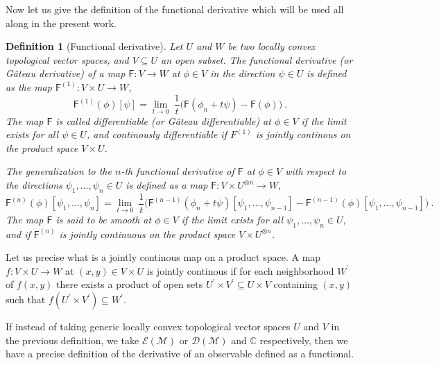 \documentclass[10pt]{book}
\newcommand{\Dcal}{\mathcal{D}}
\newcommand{\Ecal}{\mathcal{E}}
\newcommand{\Mcal}{\mathcal{M}}
\newcommand{\Cbb}{\mathbb{C}}
\newcommand{\Fsf}{\mathsf{F}}
\theoremstyle{break}
\newtheorem{definition}{Definition}
\begin{document}
\bigskip


Now let us give the definition of the functional derivative which will be used all along in the present work.


\begin{definition}[Functional derivative]\label{def:functional_derivative}
Let $U$ and $W$ be two locally convex topological vector spaces, and $V \subseteq U$ an open subset. The functional derivative (or Gâteau derivative) of a map $\Fsf:  V \to W$ at $\phi \in V$ in the direction $\psi \in U$ is defined as the map $\Fsf^{(1)} : V \times U \to W$,
%
\begin{equation*}
\Fsf^{(1)}(\phi)[\psi] = \lim_{t \to 0} \ \frac{1}{t} \bigg( \Fsf(\phi_n + t \psi) - \Fsf(\phi) \bigg) \ .
\end{equation*}
% 
The map $\Fsf$ is called differentiable (or Gâteau differentiable) at $\phi \in V$ if the limit exists for all $\psi \in U$, and continously differentiable if $F^{(1)}$ is jointly continous on the product space $V \times U$.\par%
%
%
The generalization to the $n$-th functional derivative of $\Fsf$ at $\phi \in V$ with respect to the directions $\psi_1, \dots, \psi_n \in U$ is defined as a map $\Fsf : V \times U^{\otimes n} \to W$,
%
\begin{equation*}%
\Fsf^{(n)}(\phi)[\psi_1,\dots ,\psi_n] = \lim_{t \to 0} \ \frac{1}{t} \bigg( \Fsf^{(n-1)}(\phi_n + t \psi)[\psi_1,\dots ,\psi_{n-1}] - \Fsf^{(n-1)}(\phi)[\psi_1,\dots ,\psi_{n-1}] \bigg) \ .
\end{equation*}
%
The map $\Fsf$ is said to be smooth at $\phi \in V$ if the limit exists for all $\psi_1, \dots, \psi_n \in U$, and if $\Fsf^{(n)}$ is jointly continuous on the product space $V \times U^{\otimes n}$.
\end{definition}


Let us precise what is a jointly continous map on a product space. A map $f : V \times U \to W$ at $(x,y) \in V \times U$ is jointly continous if for each neighborhood $W^\prime$ of $f(x,y)$ there exists a product of open sets $U^\prime \times V^\prime \subseteq U \times V$ containing $(x,y)$ such that $f(U^\prime \times V^\prime) \subseteq W^\prime$.


\bigskip


If instead of taking generic locally convex topological vector spaces $U$ and $V$ in the previous definition, we take $\Ecal(\Mcal)$ or $\Dcal(\Mcal)$ and $\Cbb$ respectively, then we have a precise definition of the derivative of an observable defined as a functional.
\end{document}
